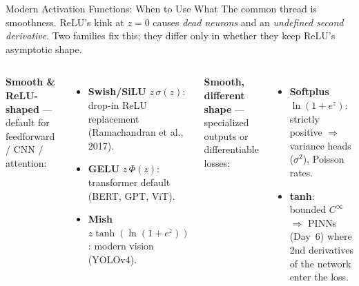 \documentclass[aspectratio=169,11pt]{beamer}
\newcommand{\emphc}[1]{\textcolor{harvardcrimson}{#1}}
\begin{document}
\begin{frame}{Modern Activation Functions: When to Use What}
{\footnotesize The common thread is \emphc{smoothness}. ReLU's kink at $z{=}0$ causes \textit{dead neurons} and an \textit{undefined second derivative}. Two families fix this; they differ only in whether they keep ReLU's asymptotic shape.}

\begin{columns}[T]
\textbf{\textcolor{softblue}{Smooth \& ReLU-shaped}} {\footnotesize --- default for feedforward / CNN / attention:}
\begin{itemize}\itemsep0pt
    \item[\textcolor{softblue}{$\blacktriangleright$}] {\footnotesize \textbf{Swish/SiLU} $z\,\sigma(z)$: drop-in ReLU replacement (Ramachandran et al., 2017).}
    \item[\textcolor{harvardcrimson}{$\blacktriangleright$}] {\footnotesize \textbf{GELU} $z\,\Phi(z)$: transformer default (BERT, GPT, ViT).}
    \item[\textcolor{softgreen}{$\blacktriangleright$}] {\footnotesize \textbf{Mish} $z\tanh(\ln(1{+}e^z))$: modern vision (YOLOv4).}
\end{itemize}

\vspace{0.1cm}
\textbf{\textcolor{softorange}{Smooth, different shape}} {\footnotesize --- specialized outputs or differentiable losses:}
\begin{itemize}\itemsep0pt
    \item[\textcolor{softorange}{$\blacktriangleright$}] {\footnotesize \textbf{Softplus} $\ln(1{+}e^z)$: strictly positive $\Rightarrow$ variance heads ($\sigma^2$), Poisson rates.}
    \item[\textcolor{uzhblue}{$\blacktriangleright$}] {\footnotesize \textbf{tanh}: bounded $C^\infty$ $\Rightarrow$ PINNs (Day~6) where 2nd derivatives of the network enter the loss.}
\end{itemize}


\end{columns}
\end{frame}
\end{document}
